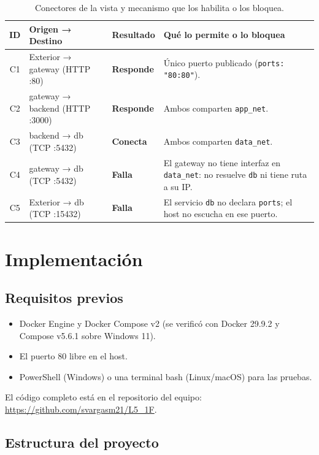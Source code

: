 \documentclass[11pt,letterpaper]{article}
\newcommand{\code}[1]{\texttt{#1}}
\newcommand{\ok}[1]{\textcolor{verde}{\textbf{#1}}}
\newcommand{\bad}[1]{\textcolor{rojo}{\textbf{#1}}}
\begin{document}
\begin{table}[H]
\centering
\small
\begin{tabularx}{\textwidth}{c l l Y}
\toprule
{}
\textbf{ID} & \textbf{Origen → Destino} & \textbf{Resultado} & \textbf{Qué lo permite o lo bloquea} \\
\midrule
C1 & Exterior → gateway (HTTP :80)       & \ok{Responde} & Único puerto publicado (\code{ports: "80:80"}). \\
C2 & gateway → backend (HTTP :3000)      & \ok{Responde} & Ambos comparten \code{app\_net}. \\
C3 & backend → db (TCP :5432)            & \ok{Conecta}  & Ambos comparten \code{data\_net}. \\
C4 & gateway → db (TCP :5432)            & \bad{Falla}   & El gateway no tiene interfaz en \code{data\_net}: no resuelve \code{db} ni tiene ruta a su IP. \\
C5 & Exterior → db (TCP :15432)          & \bad{Falla}   & El servicio \code{db} no declara \code{ports}; el host no escucha en ese puerto. \\
\bottomrule
\end{tabularx}
\caption{Conectores de la vista y mecanismo que los habilita o los bloquea.}
\end{table}

\section{Implementación}

\subsection{Requisitos previos}

\begin{itemize}
  \item Docker Engine y Docker Compose v2 (se verificó con Docker 29.9.2 y Compose v5.6.1 sobre Windows 11).
  \item El puerto 80 libre en el host.
  \item PowerShell (Windows) o una terminal bash (Linux/macOS) para las pruebas.
\end{itemize}

El código completo está en el repositorio del equipo:
\url{https://github.com/svargasm21/L5_1F}.

\subsection{Estructura del proyecto}
\end{document}
